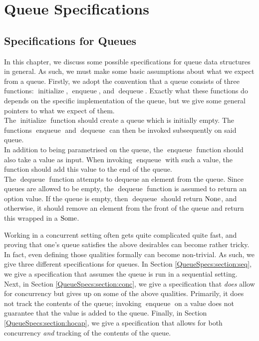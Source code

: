 \documentclass[a4paper, 10pt]{report}
\theoremstyle{definition}
\newcommand{\initialise}{\operatorname{initialize}}
\newcommand{\enqueue}{\operatorname{enqueue}}
\newcommand{\dequeue}{\operatorname{dequeue}}
\begin{document}

\chapter{Queue Specifications}
\label{ch:QueueSpecs}

\section{Specifications for Queues}
\label{QueueSpecs:section:specs}

In this chapter, we discuss some possible specifications for queue data structures in general. As such, we must make some basic assumptions about what we expect from a queue. Firstly, we adopt the convention that a queue consists of three functions: $\initialise$, $\enqueue$, and $\dequeue$. Exactly what these functions do depends on the specific implementation of the queue, but we give some general pointers to what we expect of them.\\
The $\initialise$ function should create a queue which is initially empty. The functions $\enqueue$ and $\dequeue$ can then be invoked subsequently on said queue.\\
In addition to being parametrised on the queue, the $\enqueue$ function should also take a value as input. When invoking $\enqueue$ with such a value, the function should add this value to the end of the queue.\\
The $\dequeue$ function attempts to dequeue an element from the queue. Since queues are allowed to be empty, the $\dequeue$ function is assumed to return an option value. If the queue is empty, then $\dequeue$ should return $\operatorname{None}$, and otherwise, it should remove an element from the front of the queue and return this wrapped in a $\operatorname{Some}$.

Working in a concurrent setting often gets quite complicated quite fast, and proving that one's queue satisfies the above desirables can become rather tricky. In fact, even defining those qualities formally can become non-trivial. As such, we give three different specifications for queues. In Section \ref{QueueSpecs:section:seq}, we give a specification that assumes the queue is run in a sequential setting. Next, in Section \ref{QueueSpecs:section:conc}, we give a specification that \textit{does} allow for concurrency but gives up on some of the above qualities. Primarily, it does not track the contents of the queue; invoking $\enqueue$ on a value does not guarantee that the value is added to the queue. Finally, in Section \ref{QueueSpecs:section:hocap}, we give a specification that allows for both concurrency \textit{and} tracking of the contents of the queue.
\end{document}
